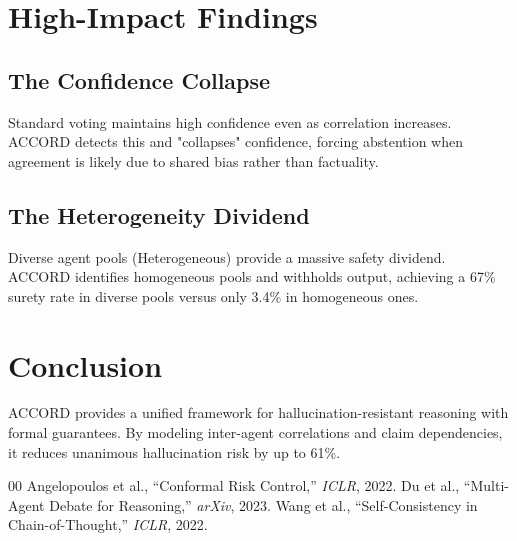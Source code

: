 \documentclass[conference]{IEEEtran}
\begin{document}
\section{High-Impact Findings}
\subsection{The Confidence Collapse}
Standard voting maintains high confidence even as correlation increases. ACCORD detects this and "collapses" confidence, forcing abstention when agreement is likely due to shared bias rather than factuality.

\subsection{The Heterogeneity Dividend}
Diverse agent pools (Heterogeneous) provide a massive safety dividend. ACCORD identifies homogeneous pools and withholds output, achieving a 67\% surety rate in diverse pools versus only 3.4\% in homogeneous ones.

\section{Conclusion}
ACCORD provides a unified framework for hallucination-resistant reasoning with formal guarantees. By modeling inter-agent correlations and claim dependencies, it reduces unanimous hallucination risk by up to 61\%.

\begin{thebibliography}{00}
 Angelopoulos et al., ``Conformal Risk Control,'' \textit{ICLR}, 2022.
 Du et al., ``Multi-Agent Debate for Reasoning,'' \textit{arXiv}, 2023.
 Wang et al., ``Self-Consistency in Chain-of-Thought,'' \textit{ICLR}, 2022.
\end{thebibliography}
\end{document}
